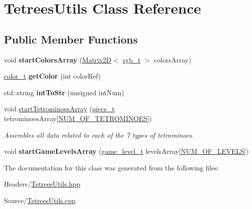 \hypertarget{classTetreesUtils}{}\section{Tetrees\+Utils Class Reference}
\label{classTetreesUtils}
\subsection*{Public Member Functions}
\begin{DoxyCompactItemize}
\item 
\mbox{\label{classTetreesUtils_afaeab256a68024309eefbbdfae158397}} 
void {\bfseries start\+Colors\+Array} (\hyperlink{classMatrix2D}{Matrix2D}$<$ \hyperlink{structrgb__t}{rgb\+\_\+t} $>$ colors\+Array)
\item 
\mbox{\label{classTetreesUtils_a812d9a7bee07fef5dfcec1fd36c4b502}} 
\hyperlink{TetreesDefs_8hpp_a8ba5fbce2446135735693ab60c896bbd}{color\+\_\+t} {\bfseries get\+Color} (int color\+Ref)
\item 
\mbox{\label{classTetreesUtils_ad6ece1c845969a3535b8a6d971d8ddcb}} 
std\+::string {\bfseries int\+To\+Str} (unsigned int\+Num)
\item 
\mbox{\label{classTetreesUtils_acb377319f6772d9e88f677273c895912}} 
void \hyperlink{classTetreesUtils_acb377319f6772d9e88f677273c895912}{start\+Tetrominoes\+Array} (\hyperlink{structpiece__t}{piece\+\_\+t} tetrominoes\+Array\mbox{[}\hyperlink{TetreesDefs_8hpp_a69fa4aa1afe74f7f9ec42bf1e07ddf28}{N\+U\+M\+\_\+\+O\+F\+\_\+\+T\+E\+T\+R\+O\+M\+I\+N\+O\+ES}\mbox{]})
\begin{DoxyCompactList}\small\item\em Assembles all data related to each of the 7 types of tetrominoes. \end{DoxyCompactList}\item 
\mbox{\label{classTetreesUtils_a1bbb7dbec571bf3490fd74fcdacc7640}} 
void {\bfseries start\+Game\+Levels\+Array} (\hyperlink{structgame__level__t}{game\+\_\+level\+\_\+t} levels\+Array\mbox{[}\hyperlink{TetreesDefs_8hpp_a350a4204247d3562e237e289533cc31f}{N\+U\+M\+\_\+\+O\+F\+\_\+\+L\+E\+V\+E\+LS}\mbox{]})
\end{DoxyCompactItemize}


The documentation for this class was generated from the following files\+:\begin{DoxyCompactItemize}
\item 
Headers/\hyperlink{TetreesUtils_8hpp}{Tetrees\+Utils.\+hpp}\item 
Source/\hyperlink{TetreesUtils_8cpp}{Tetrees\+Utils.\+cpp}\end{DoxyCompactItemize}

